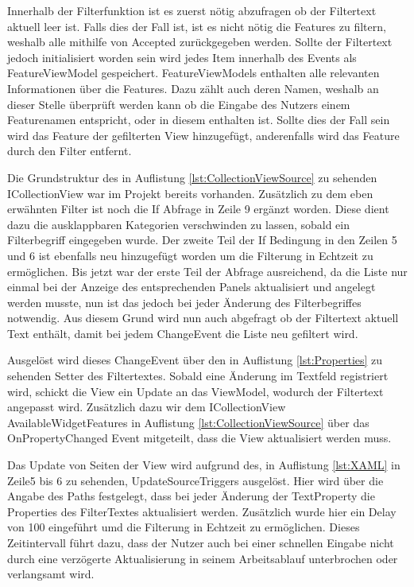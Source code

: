 

Innerhalb der Filterfunktion ist es zuerst nötig abzufragen ob der Filtertext aktuell leer ist.
Falls dies der Fall ist, ist es nicht nötig die Features zu filtern, weshalb alle mithilfe von Accepted zurückgegeben werden.
Sollte der Filtertext jedoch initialisiert worden sein wird jedes Item innerhalb des Events als FeatureViewModel gespeichert.
FeatureViewModels enthalten alle relevanten Informationen über die Features.
Dazu zählt auch deren Namen, weshalb an dieser Stelle überprüft werden kann ob die Eingabe des Nutzers einem Featurenamen entspricht, oder in diesem enthalten ist.
Sollte dies der Fall sein wird das Feature der gefilterten View hinzugefügt, anderenfalls wird das Feature durch den Filter entfernt.



Die Grundstruktur des in Auflistung \ref{lst:CollectionViewSource} zu sehenden ICollectionView war im Projekt bereits vorhanden. 
Zusätzlich zu dem eben erwähnten Filter ist noch die If Abfrage in Zeile 9 ergänzt worden.
Diese dient dazu die ausklappbaren Kategorien verschwinden zu lassen, sobald ein Filterbegriff eingegeben wurde.
Der zweite Teil der If Bedingung in den Zeilen 5 und 6 ist ebenfalls neu hinzugefügt worden um die Filterung in Echtzeit zu ermöglichen.
Bis jetzt war der erste Teil der Abfrage ausreichend, da die Liste nur einmal bei der Anzeige des entsprechenden Panels aktualisiert und angelegt werden musste, nun ist das jedoch bei jeder Änderung des Filterbegriffes notwendig.
Aus diesem Grund wird nun auch abgefragt ob der Filtertext aktuell Text enthält, damit bei jedem ChangeEvent die Liste neu gefiltert wird.



Ausgelöst wird dieses ChangeEvent über den in Auflistung \ref{lst:Properties} zu sehenden Setter des Filtertextes.
Sobald eine Änderung im Textfeld registriert wird, schickt die View ein Update an das ViewModel, wodurch der Filtertext angepasst wird.
Zusätzlich dazu  wir dem ICollectionView AvailableWidgetFeatures in Auflistung \ref{lst:CollectionViewSource} über das OnPropertyChanged Event mitgeteilt, dass die View aktualisiert werden muss.

Das Update von Seiten der View wird aufgrund des, in Auflistung \ref{lst:XAML} in Zeile5 bis 6 zu sehenden, UpdateSourceTriggers ausgelöst. 
Hier wird über die Angabe des Paths festgelegt, dass bei jeder Änderung der TextProperty die Properties des FilterTextes aktualisiert werden.
Zusätzlich wurde hier ein Delay von 100 eingeführt umd die Filterung in Echtzeit zu ermöglichen.
Dieses Zeitintervall führt dazu, dass der Nutzer auch bei einer schnellen Eingabe nicht durch eine verzögerte Aktualisierung in seinem Arbeitsablauf unterbrochen  oder verlangsamt wird.




